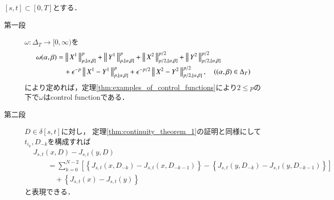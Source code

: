 	\begin{prf}$[s,t] \subset [0,T]$とする．
		\begin{description}
			\item[第一段]
				$\omega:\Delta_T \longrightarrow [0,\infty)$を
				\begin{align}
					\omega(\alpha,\beta) &= \left\|\, X^1\, \right\|_{p,[\alpha,\beta]}^p + \left\|\, Y^1\, \right\|_{p,[\alpha,\beta]}^p 
						+ \left\|\, X^2\, \right\|_{p/2,[\alpha,\beta]}^{p/2} + \left\|\, Y^2\, \right\|_{p/2,[\alpha,\beta]}^{p/2} \\
						&\quad + \epsilon^{-p} \left\|\, X^1 - Y^1\, \right\|_{p,[\alpha,\beta]}^p +  \epsilon^{-p/2} \left\|\, X^2 - Y^2\, \right\|_{p/2,[\alpha,\beta]}^{p/2},
					\quad ((\alpha,\beta) \in \Delta_T)
				\end{align}
				により定めれば，定理\ref{thm:examples_of_control_functions}により$2 \leq p$の下で$\omega$はcontrol functionである．
				
			\item[第二段]
				$D \in \delta[s,t]$に対し，
				定理\ref{thm:continuity_theorem_1}の証明と同様にして
				$t_{i_k},D_{-k}$を構成すれば
				\begin{align}
					&J_{s,t}(x,D) - J_{s,t}(y,D) \\
					&\qquad= \sum_{k=0}^{N-2} \left[ \left\{ J_{s,t}(x,D_{-k}) - J_{s,t}(x,D_{-k-1}) \right\} - 
						\left\{ J_{s,t}(y,D_{-k}) - J_{s,t}(y,D_{-k-1}) \right\} \right] \label{eq:continuity_theorem_2_1}\\
					&\quad\qquad + \left\{ J_{s,t}(x) - J_{s,t}(y) \right\}	\label{eq:continuity_theorem_2_2}
				\end{align}
				と表現できる．
			

\end{description}
\end{prf}
